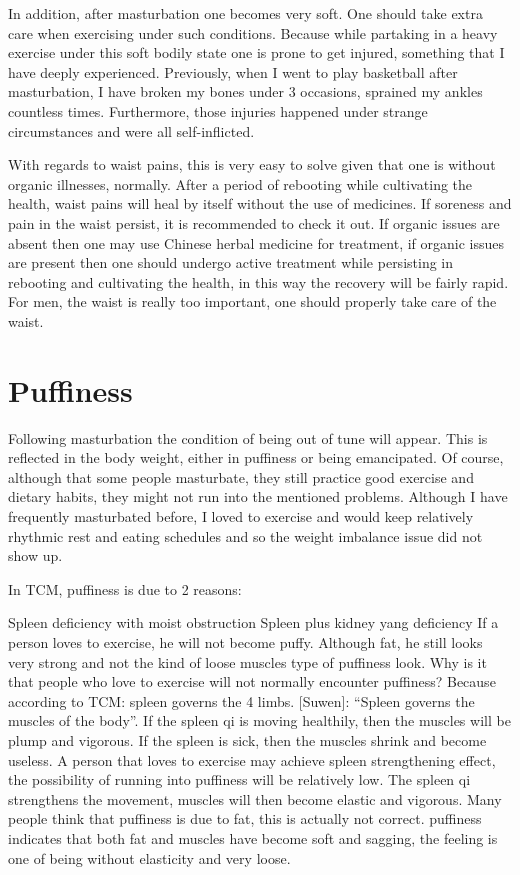 \documentclass[
]{book}
\begin{document}
In addition, after masturbation one becomes very soft. One should take extra care when exercising under such conditions. Because while partaking in a heavy exercise under this soft bodily state one is prone to get injured, something that I have deeply experienced. Previously, when I went to play basketball after masturbation, I have broken my bones under 3 occasions, sprained my ankles countless times. Furthermore, those injuries happened under strange circumstances and were all self-inflicted.

With regards to waist pains, this is very easy to solve given that one is without organic illnesses, normally. After a period of rebooting while cultivating the health, waist pains will heal by itself without the use of medicines. If soreness and pain in the waist persist, it is recommended to check it out. If organic issues are absent then one may use Chinese herbal medicine for treatment, if organic issues are present then one should undergo active treatment while persisting in rebooting and cultivating the health, in this way the recovery will be fairly rapid. For men, the waist is really too important, one should properly take care of the waist.

\hypertarget{puffiness}{%
\section{Puffiness}\label{puffiness}}

Following masturbation the condition of being out of tune will appear. This is reflected in the body weight, either in puffiness or being emancipated. Of course, although that some people masturbate, they still practice good exercise and dietary habits, they might not run into the mentioned problems. Although I have frequently masturbated before, I loved to exercise and would keep relatively rhythmic rest and eating schedules and so the weight imbalance issue did not show up.

In TCM, puffiness is due to 2 reasons:

Spleen deficiency with moist obstruction
Spleen plus kidney yang deficiency
If a person loves to exercise, he will not become puffy. Although fat, he still looks very strong and not the kind of loose muscles type of puffiness look. Why is it that people who love to exercise will not normally encounter puffiness? Because according to TCM: spleen governs the 4 limbs. {[}Suwen{]}: ``Spleen governs the muscles of the body''. If the spleen qi is moving healthily, then the muscles will be plump and vigorous. If the spleen is sick, then the muscles shrink and become useless. A person that loves to exercise may achieve spleen strengthening effect, the possibility of running into puffiness will be relatively low. The spleen qi strengthens the movement, muscles will then become elastic and vigorous. Many people think that puffiness is due to fat, this is actually not correct. puffiness indicates that both fat and muscles have become soft and sagging, the feeling is one of being without elasticity and very loose.
\end{document}
